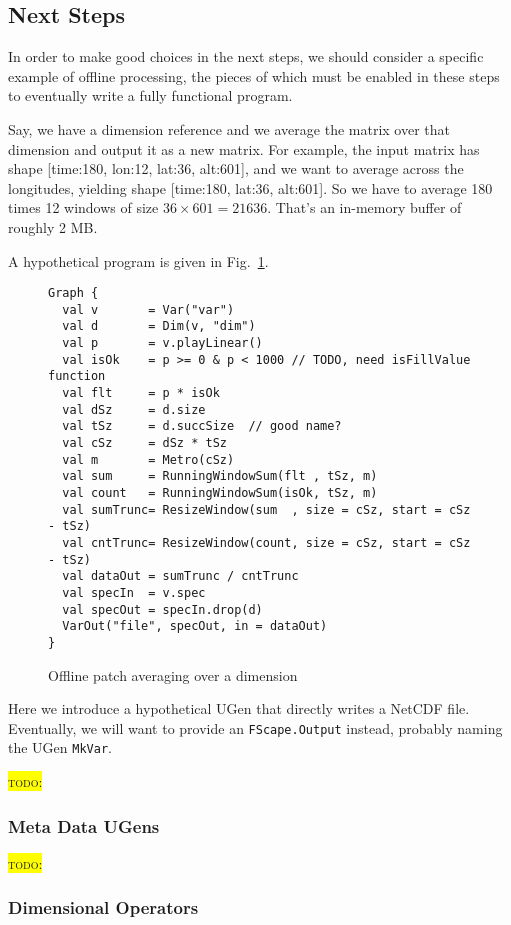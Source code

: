 \documentclass[11pt,a4paper]{article}
\newcommand{\todo}[1]{\colorbox{yellow}{\textsc{todo}: #1}}
\newcommand{\figref}[1]{Fig.~\ref{#1}}
\begin{document}
\subsection{Next Steps}

In order to make good choices in the next steps, we should consider a specific example of offline processing, the pieces of which must be enabled in these steps to eventually write a fully functional program.

Say, we have a dimension reference and we average the matrix over that dimension and output it as a new matrix. For example, the input matrix has shape [time:180, lon:12, lat:36, alt:601], and we want to average across the longitudes, yielding shape [time:180, lat:36, alt:601]. So we have to average 180 times 12 windows of size $36 \times 601 = 21636$. That's an in-memory buffer of roughly 2 MB.

A hypothetical program is given in \figref{lst:averaging}.
%
\begin{figure}
\begin{lstlisting}[style=scala]
Graph {
  val v       = Var("var")
  val d       = Dim(v, "dim")
  val p       = v.playLinear()
  val isOk    = p >= 0 & p < 1000 // TODO, need isFillValue function
  val flt     = p * isOk
  val dSz     = d.size
  val tSz     = d.succSize  // good name?
  val cSz     = dSz * tSz
  val m       = Metro(cSz)
  val sum     = RunningWindowSum(flt , tSz, m)
  val count   = RunningWindowSum(isOk, tSz, m)
  val sumTrunc= ResizeWindow(sum  , size = cSz, start = cSz - tSz)
  val cntTrunc= ResizeWindow(count, size = cSz, start = cSz - tSz)
  val dataOut = sumTrunc / cntTrunc
  val specIn  = v.spec
  val specOut = specIn.drop(d)
  VarOut("file", specOut, in = dataOut)
}
\end{lstlisting}
\caption{Offline patch averaging over a dimension}
\label{lst:averaging}
\end{figure}

Here we introduce a hypothetical UGen that directly writes a NetCDF file. Eventually, we will want to provide an \Verb!FScape.Output! instead, probably naming the UGen \Verb!MkVar!.

\todo{}

\subsubsection{Meta Data UGens}

\todo{}

\subsubsection{Dimensional Operators}
\end{document}
